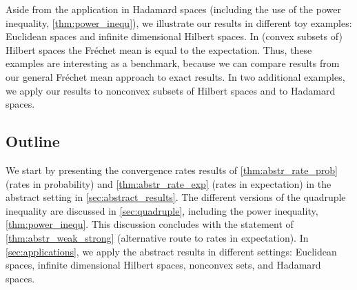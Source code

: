 Aside from the application in Hadamard spaces (including the use of the power inequality, \autoref{thm:power_inequ}), we illustrate our results in different toy examples: Euclidean spaces and infinite dimensional Hilbert spaces. In (convex subsets of) Hilbert spaces the Fréchet mean is equal to the expectation. Thus, these examples are interesting as a benchmark, because we can compare results from our general Fréchet mean approach to exact results. In two additional examples, we apply our results to nonconvex subsets of Hilbert spaces and to Hadamard spaces.
%
%
\subsection{Outline}
%
We start by presenting the convergence rates results of \autoref{thm:abstr_rate_prob} (rates in probability) and \autoref{thm:abstr_rate_exp} (rates in expectation) in the abstract setting in \autoref{sec:abstract_results}. The different versions of the quadruple inequality are discussed in \autoref{sec:quadruple}, including the power inequality, \autoref{thm:power_inequ}. This discussion concludes with the statement of \autoref{thm:abstr_weak_strong} (alternative route to rates in expectation). In \autoref{sec:applications}, we apply the abstract results in different settings: Euclidean spaces, infinite dimensional Hilbert spaces, nonconvex sets, and Hadamard spaces.
%
